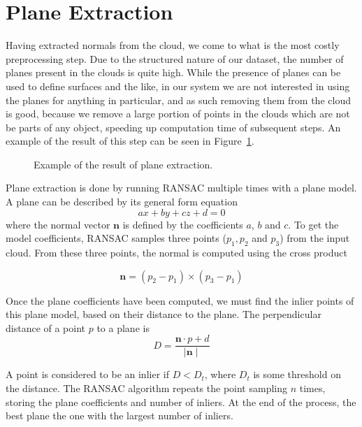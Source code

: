 \documentclass[11pt,a4paper]{kth-mag}
\begin{document}
\section{Plane Extraction}
Having extracted normals from the cloud, we come to what is the most costly
preprocessing step. Due to the structured nature of our dataset, the number of
planes present in the clouds is quite high. While the presence of planes can be
used to define surfaces and the like, in our system we are not interested in
using the planes for anything in particular, and as such removing them from the
cloud is good, because we remove a large portion of points in the clouds which
are not be parts of any object, speeding up computation time of subsequent
steps. An example of the result of this step can be seen in
Figure~\ref{fig:plane_extr}.

\begin{figure}
  \centering
  
  \caption{Example of the result of plane extraction.}
  \label{fig:plane_extr}
\end{figure}

Plane extraction is done by running RANSAC multiple times with a plane model. A
plane can be described by its general form equation
\begin{equation}
  \label{eq:1}
  ax+by+cz+d=0
\end{equation}
where the normal vector $\mathbf{n}$ is defined by the coefficients $a$, $b$ and
$c$. To get the model coefficients, RANSAC samples three points ($p_1,p_2$ and
$p_3$) from the input cloud. From these three points, the normal is computed
using the cross product \cite{planeeq}

\begin{equation}
  \label{eq:2}
  \mathbf{n}=(p_2-p_1)\times(p_3-p_1)
\end{equation}

Once the plane coefficients have been computed, we must find the inlier points of this
plane model, based on their distance to the plane. The perpendicular distance of
a point $p$ to a plane is
\begin{equation}
  \label{eq:3}
  D=\frac{\mathbf{n}\cdot p + d}{\mid \mathbf{n} \mid}
\end{equation}

A point is considered to be an inlier if $D<D_t$, where $D_t$ is some threshold
on the distance. The RANSAC algorithm repeats the point sampling $n$ times,
storing the plane coefficients and number of inliers. At the end of the process,
the best plane the one with the largest number of inliers.
\end{document}
